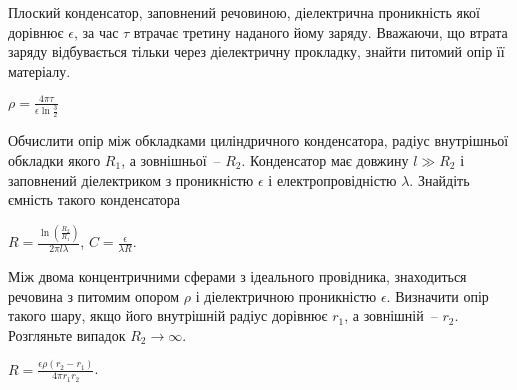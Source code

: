 \begin{problem}
Плоский конденсатор, заповнений речовиною, діелектрична проникність якої дорівнює $\epsilon$, за час $\tau$ втрачає третину наданого йому заряду. Вважаючи, що втрата заряду відбувається тільки через діелектричну прокладку, знайти питомий опір її матеріалу.
\begin{solution}
	$\rho = \frac{4\pi\tau}{\epsilon\ln\frac32}$
\end{solution}
\end{problem}

\begin{problem}\label{Lim1044}
Обчислити опір між обкладками циліндричного конденсатора, радіус внутрішньої обкладки якого $R_1$, а зовнішньої~-- $R_2$. Конденсатор має довжину $l \gg R_2$ і заповнений діелектриком з проникністю $\epsilon$ і електропровідністю $\lambda$. Знайдіть ємність такого конденсатора
\begin{solution}
	$R = \frac{\ln\left( \frac{R_2}{R_1} \right)}{2\pi l\lambda}$, $C = \frac{\epsilon}{\lambda R}$.
\end{solution}
\end{problem}

\begin{problem}
Між двома концентричними сферами з ідеального провідника, знаходиться речовина з питомим опором $\rho$ і діелектричною проникністю $\epsilon$. Визначити опір такого шару, якщо його внутрішній радіус дорівнює $r_1$, а зовнішній~-- $r_2$. Розгляньте випадок $R_2 \to \infty$.
\begin{solution}
	$R = \frac{\epsilon\rho\left( r_2 - r_1 \right)}{4\pi r_1r_2}$.
\end{solution}
\end{problem}

